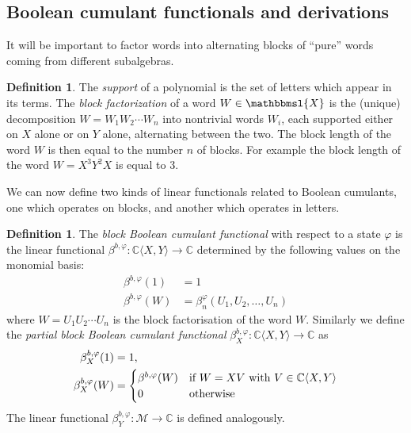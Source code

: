 \documentclass[12pt]{amsart}
\newcommand\IC{{\mathbb C}}
\def\eps{\epsilon}
\newcommand{\alg}[1]{\mathcal{#1}}
\newcommand{\alf}[1]{\mathbbmsl{#1}} %
\theoremstyle{definition}
\newtheorem{definition}[theorem]{Definition}
\numberwithin{equation}{section}
\begin{document}
  		

\subsection{Boolean cumulant functionals and derivations}

It will be important to factor words into alternating blocks of ``pure''
words coming from different subalgebras.

\begin{definition}
  The \emph{support} of a polynomial is the set of letters which appear in its
  terms.
  The \emph{block factorization} of a word
  $W\in \alf{X}$ is the (unique) decomposition
  $W=W_1W_2\cdots  W_n$ into nontrivial words $W_i$, each supported either on $X$ alone or on $Y$ alone, alternating between the two.
  The  block length of the word $W$ is then equal to the number $n$ of blocks. For example the block length of the word $W=X^3Y^2X$ is equal to 3.
\end{definition}


We can now define two kinds of linear functionals related to Boolean cumulants,
one which operates on blocks, and another which operates in letters. 
\begin{definition}
  The \emph{block Boolean cumulant functional}
  with respect to a state  $\varphi$
  is the linear functional
  $\beta^{b,\varphi}:\IC\langle  X,Y\rangle\to\mathbb{C}$
  determined by the following values on the monomial basis:
  \begin{equation*}
    \begin{aligned}
      \beta^{b,\varphi}(1)&=1\\
        \beta^{b,\varphi}(W)& = \beta_n^\varphi(U_1,U_2,\ldots,U_n)
    \end{aligned}
  \end{equation*}
  where  $W=U_1U_2\cdots U_n$ is the block factorisation of the word $W$.  
  Similarly we  define the  \emph{partial block Boolean cumulant functional}
  $\beta^{b,\varphi}_X:\IC\langle X,Y\rangle\to\mathbb{C}$ as 
  \begin{align*}
    \beta^{b,\varphi}_X(1)
    &= 1,
    \\ \beta^{b,\varphi}_X(W)
    &=
      \begin{cases}
        \beta^{b,\varphi}(W) & \text{if $W=X V$ with
          $V\in \IC\langle X,Y\rangle$}\\
        $0$ & \text{otherwise}
      \end{cases}
  \end{align*}
  The linear functional  $\beta^{b,\varphi}_Y:\alg{M}\to\mathbb{C}$ is defined analogously.
\end{definition}
\end{document}
